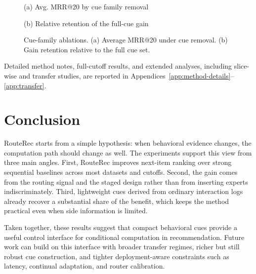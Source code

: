 \documentclass[sigconf,review,anonymous]{acmart}
\newcommand{\placeholderpanel}[1]{\fbox{\rule{0pt}{#1}\rule{0.92\linewidth}{0pt}}}
\begin{document}
\begin{figure}[!t]
  \centering
  \begin{minipage}[t]{0.48\columnwidth}
    \centering
    \placeholderpanel{1.25in}

    \vspace{0.35em}
    {\footnotesize (a) Avg. MRR@20 by cue family removal}
  \end{minipage}\hfill
  \begin{minipage}[t]{0.48\columnwidth}
    \centering
    \placeholderpanel{1.25in}

    \vspace{0.35em}
    {\footnotesize (b) Relative retention of the full-cue gain}
  \end{minipage}
  \caption{Cue-family ablations. (a) Average MRR@20 under cue removal. (b) Gain retention relative to the full cue set.}
  \label{fig:cue-ablation-panels}
\end{figure}

Detailed method notes, full-cutoff results, and extended analyses, including slice-wise and transfer studies, are reported in Appendices~\ref{app:method-details}--\ref{app:transfer}.

\section{Conclusion}
\label{sec:conclusion}
RouteRec starts from a simple hypothesis: when behavioral evidence changes, the computation path should change as well. The experiments support this view from three main angles. First, RouteRec improves next-item ranking over strong sequential baselines across most datasets and cutoffs. Second, the gain comes from the routing signal and the staged design rather than from inserting experts indiscriminately. Third, lightweight cues derived from ordinary interaction logs already recover a substantial share of the benefit, which keeps the method practical even when side information is limited.

Taken together, these results suggest that compact behavioral cues provide a useful control interface for conditional computation in recommendation. Future work can build on this interface with broader transfer regimes, richer but still robust cue construction, and tighter deployment-aware constraints such as latency, continual adaptation, and router calibration.



\end{document}
